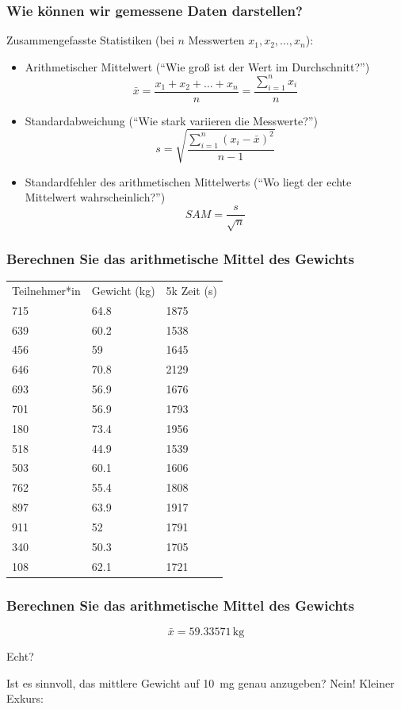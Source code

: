 \documentclass{beamer}
\begin{document}
\begin{frame}
\frametitle{Wie können wir gemessene Daten darstellen?}

Zusammengefasste Statistiken (bei \(n\) Messwerten \(x_1, x_2, \dots, x_n\)):

\begin{itemize}
\item
Arithmetischer Mittelwert (``Wie groß ist der Wert im Durchschnitt?'')
\[
\bar{x} =  \frac{x_1 + x_2 + \dots + x_n}{n} = \frac{\sum_{i=1}^n x_i}{n}
\]
\pause
\item
Standardabweichung (``Wie stark variieren die Messwerte?'')
\[
s = \sqrt{\frac{\sum_{i=1}^n (x_i-\bar{x})^2}{n-1}}
\]
\pause
\item
Standardfehler des arithmetischen Mittelwerts (``Wo liegt der echte Mittelwert wahrscheinlich?'')
\[
SAM = \frac{s}{\sqrt{n}}
\]
\end{itemize}


\end{frame}

 
\begin{frame}
\frametitle{Berechnen Sie das arithmetische  Mittel des Gewichts}

\begin{tabular}{lll}
Teilnehmer*in   & Gewicht (kg)  &  5k Zeit (s)  \\
715 &	64.8 &	1875  \\
639 &	60.2 &	1538 \\
456 &	59 &	1645 \\
646 &	70.8 &	2129 \\
693 &	56.9 &	1676 \\
701 &	56.9 &	1793 \\
180 &	73.4 &	1956 \\
518 &	44.9 &	1539 \\
503 &	60.1 &	1606 \\
762 &	55.4 &	1808 \\
897 &	63.9 &	1917 \\
911 &	52 &	1791 \\
340 &	50.3 &	1705 \\
108 &	62.1 &	1721 \\
\end{tabular}



\end{frame}

\begin{frame}
\frametitle{Berechnen Sie das arithmetische  Mittel des Gewichts}

\[
\bar{x} = 59.33571\,\text{kg}
\]


\pause

Echt?

\pause

Ist es sinnvoll, das mittlere Gewicht auf \SI{10}{\milli\gram} genau anzugeben?  \pause Nein! Kleiner Exkurs:


\end{frame}
\end{document}
